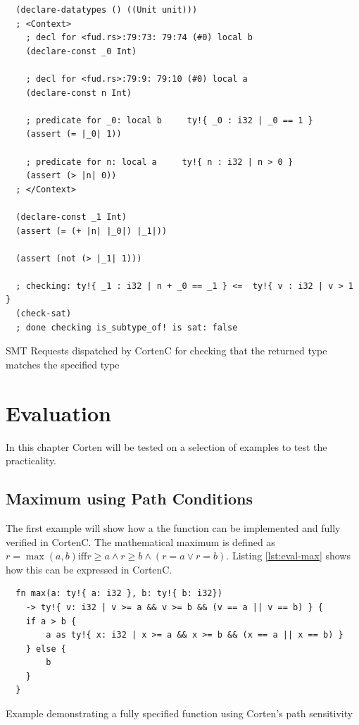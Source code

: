 \documentclass[twoside, english]{sdqthesis}
\theoremstyle{definition}
\begin{document}
\begin{listing}[ht]
  \begin{verbatim}
  (declare-datatypes () ((Unit unit)))
  ; <Context>
    ; decl for <fud.rs>:79:73: 79:74 (#0) local b
    (declare-const _0 Int)
    
    ; decl for <fud.rs>:79:9: 79:10 (#0) local a
    (declare-const n Int)
    
    ; predicate for _0: local b     ty!{ _0 : i32 | _0 == 1 }
    (assert (= |_0| 1))
    
    ; predicate for n: local a     ty!{ n : i32 | n > 0 }
    (assert (> |n| 0))
  ; </Context>

  (declare-const _1 Int)
  (assert (= (+ |n| |_0|) |_1|))
  
  (assert (not (> |_1| 1)))
  
  ; checking: ty!{ _1 : i32 | n + _0 == _1 } <=  ty!{ v : i32 | v > 1 }
  (check-sat)
  ; done checking is_subtype_of! is sat: false
  \end{verbatim}
  \caption{SMT Requests dispatched by CortenC for checking that the returned type matches the specified type}
  \label{lst:smt-sample-output}
\end{listing}


\chapter{Evaluation} \label{ch:evaluation}

In this chapter Corten will be tested on a selection of examples to test the practicality.

\section{Maximum using Path Conditions}

The first example will show how a the  function can be implemented and fully verified in CortenC. The mathematical maximum is defined as $r = \max(a, b) \text{iff} r \geq a \wedge r \geq b \wedge (r = a \vee r = b)$. Listing \ref{lst:eval-max} shows how this can be expressed in CortenC.


\begin{listing}[ht]
  \begin{verbatim}
  fn max(a: ty!{ a: i32 }, b: ty!{ b: i32}) 
    -> ty!{ v: i32 | v >= a && v >= b && (v == a || v == b) } {
    if a > b {
        a as ty!{ x: i32 | x >= a && x >= b && (x == a || x == b) }
    } else {
        b
    }
  }
  \end{verbatim}
  \caption{Example demonstrating a fully specified  function using Corten's path sensitivity}
  \label{lst:eval-max}
\end{listing}
\end{document}
